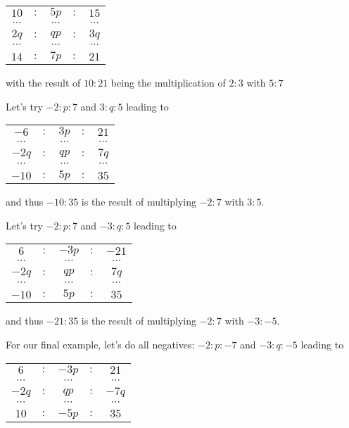 \documentclass[12pt]{article}
\begin{document}
\begin{enumerate}
     \begin{tabular}{ccccc}
        $10$ &$:$& $5p$ &$:$& $15$ \\
        $\cdots$ & & $\cdots$ & & $\cdots$ \\
        $2q$ &$:$& $qp$ &$:$& $3q$\\
        $\cdots$ & & $\cdots$ & & $\cdots$ \\
         $14$ &$:$& $7p$&$:$& $21$
    \end{tabular}
    
    with the result of $10:21$ being the multiplication of $2:3$ with $5:7$
    
    Let's try $-2 : p : 7$ and $3: q : 5$ leading to
    
     \begin{tabular}{ccccc}
        $-6$ &$:$& $3p$ &$:$& $21$ \\
        $\cdots$ & & $\cdots$ & & $\cdots$ \\
        $-2q$ &$:$& $qp$ &$:$& $7q$\\
        $\cdots$ & & $\cdots$ & & $\cdots$ \\
         $-10$ &$:$& $5p$&$:$& $35$
    \end{tabular}
    
    and thus $-10:35$ is the result of multiplying $-2:7$ with $3:5$.

    Let's try $-2 : p : 7$ and $-3: q : 5$ leading to
    
     \begin{tabular}{ccccc}
        $6$ &$:$& $-3p$ &$:$& $-21$ \\
        $\cdots$ & & $\cdots$ & & $\cdots$ \\
        $-2q$ &$:$& $qp$ &$:$& $7q$\\
        $\cdots$ & & $\cdots$ & & $\cdots$ \\
         $-10$ &$:$& $5p$&$:$& $35$
    \end{tabular}
    
    and thus $-21:35$ is the result of multiplying $-2:7$ with $-3:-5$.

    For our final example, let's do all negatives: $-2 : p : -7$ and $-3: q : -5$ leading to
    
     \begin{tabular}{ccccc}
        $6$ &$:$& $-3p$ &$:$& $21$ \\
        $\cdots$ & & $\cdots$ & & $\cdots$ \\
        $-2q$ &$:$& $qp$ &$:$& $-7q$\\
        $\cdots$ & & $\cdots$ & & $\cdots$ \\
         $10$ &$:$& $-5p$&$:$& $35$
    \end{tabular}
    

\end{enumerate}
\end{document}
